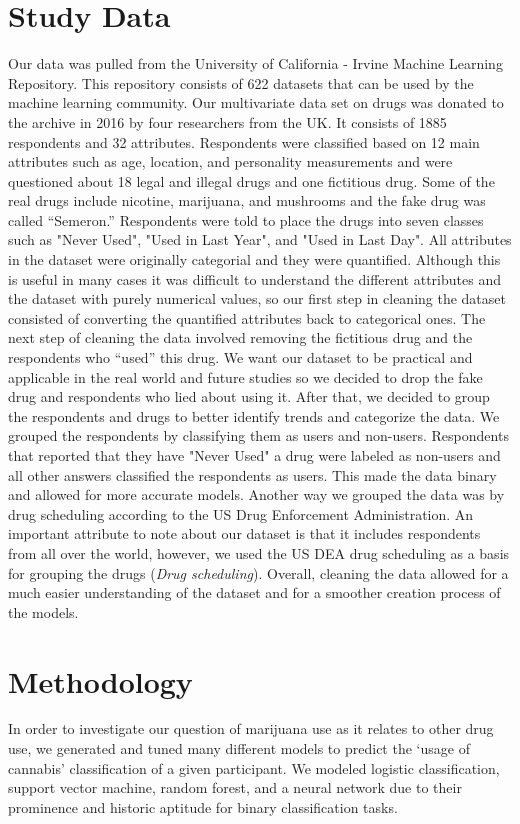 \documentclass{article}
\begin{document}
\section{Study Data}
\vspace*{-2mm}
Our data was pulled from the University of California - Irvine Machine Learning Repository. This repository consists of 622 datasets that can be used by the machine learning community. Our multivariate data set on drugs was donated to the archive in 2016 by four researchers from the UK. It consists of 1885 respondents and 32 attributes. Respondents were classified based on 12 main attributes such as age, location, and personality measurements and were questioned about 18 legal and illegal drugs and one fictitious drug. Some of the real drugs include nicotine, marijuana, and mushrooms and the fake drug was called “Semeron.” Respondents were told to place the drugs into seven classes such as "Never Used", "Used in Last Year", and "Used in Last Day". All attributes in the dataset were originally categorial and they were quantified. Although this is useful in many cases it was difficult to understand the different attributes and the dataset with purely numerical values, so our first step in cleaning the dataset consisted of converting the quantified attributes back to categorical ones. The next step of cleaning the data involved removing the fictitious drug and the respondents who “used” this drug. We want our dataset to be practical and applicable in the real world and future studies so we decided to drop the fake drug and respondents who lied about using it. After that, we decided to group the respondents and drugs to better identify trends and categorize the data. We grouped the respondents by classifying them as users and non-users. Respondents that reported that they have "Never Used" a drug were labeled as non-users and all other answers classified the respondents as users. This made the data binary and allowed for more accurate models. Another way we grouped the data was by drug scheduling according to the US Drug Enforcement Administration. An important attribute to note about our dataset is that it includes respondents from all over the world, however, we used the US DEA drug scheduling as a basis for grouping the drugs ({\it Drug scheduling}). Overall, cleaning the data allowed for a much easier understanding of the dataset and for a smoother creation process of the models.  
\vspace*{-4mm}
\section{Methodology}
\vspace*{-2mm}
In order to investigate our question of marijuana use as it relates to other drug use, we generated and tuned many different models to predict the ‘usage of cannabis’ classification of a given participant. We modeled logistic classification, support vector machine, random forest, and a neural network due to their prominence and historic aptitude for binary classification tasks.
\vspace*{-4mm}
\end{document}
